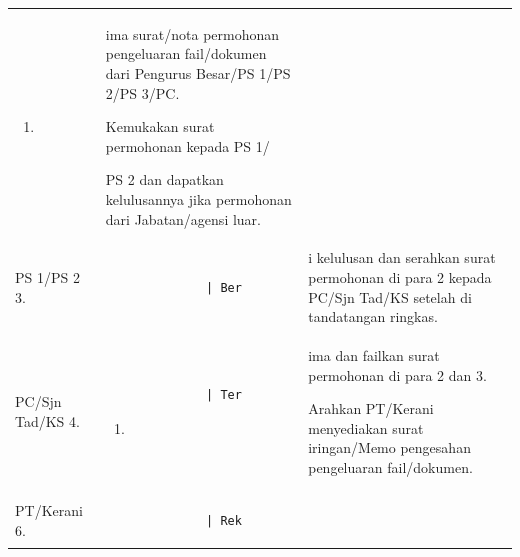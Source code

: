 \documentclass[
]{article}
\begin{document}
\begin{longtable}[]{@{}lll@{}}
\begin{minipage}[t]{0.30\columnwidth}
\begin{enumerate}
\def\labelenumi{\arabic{enumi}.}
\setcounter{enumi}{1}
\item
\end{enumerate}\strut
\end{minipage} & \begin{minipage}[t]{0.30\columnwidth}\raggedright
ima surat/nota permohonan pengeluaran fail/dokumen dari Pengurus
Besar/PS 1/PS 2/PS 3/PC.

Kemukakan surat permohonan kepada PS 1/

PS 2 dan dapatkan kelulusannya jika permohonan dari Jabatan/agensi
luar.\strut
\end{minipage}\tabularnewline
\begin{minipage}[t]{0.30\columnwidth}\raggedright
PS 1/PS 2 \textbar{} 3.\strut
\end{minipage} & \begin{minipage}[t]{0.30\columnwidth}\raggedright
\begin{verbatim}
              | Ber
\end{verbatim}
\strut
\end{minipage} & \begin{minipage}[t]{0.30\columnwidth}\raggedright
i kelulusan dan serahkan surat permohonan di para 2 kepada PC/Sjn Tad/KS
setelah di tandatangan ringkas.\strut
\end{minipage}\tabularnewline
\begin{minipage}[t]{0.30\columnwidth}\raggedright
PC/Sjn Tad/KS \textbar{} 4.\strut
\end{minipage} & \begin{minipage}[t]{0.30\columnwidth}\raggedright
\begin{verbatim}
              | Ter
\end{verbatim}

\begin{enumerate}
\def\labelenumi{\arabic{enumi}.}
\setcounter{enumi}{4}
\item
\end{enumerate}\strut
\end{minipage} & \begin{minipage}[t]{0.30\columnwidth}\raggedright
ima dan failkan surat permohonan di para 2 dan 3.

Arahkan PT/Kerani menyediakan surat iringan/Memo pengesahan pengeluaran
fail/dokumen.\strut
\end{minipage}\tabularnewline
\begin{minipage}[t]{0.30\columnwidth}\raggedright
PT/Kerani \textbar{} 6.\strut
\end{minipage} & \begin{minipage}[t]{0.30\columnwidth}\raggedright
\begin{verbatim}
              | Rek
\end{verbatim}


\end{minipage}
\end{longtable}
\end{document}
